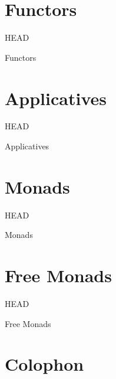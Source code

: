 \documentclass[utf8x,notes,17pt]{beamer}
\newcommand{\head}[1]{\begin{center}
\vspace{13mm}\hspace{-1mm}\Huge{{#1}}
\end{center}}
\begin{document}
\section{Functors}
\label{sec-14}
\begin{frame}[fragile,plain,label=sec-14-1]{HEAD}
\head{Functors}
\end{frame}
\section{Applicatives}
\label{sec-15}
\begin{frame}[fragile,plain,label=sec-15-1]{HEAD}
\head{Applicatives}
\end{frame}
\section{Monads}
\label{sec-16}
\begin{frame}[fragile,plain,label=sec-16-1]{HEAD}
\head{Monads}
\end{frame}
\section{Free Monads}
\label{sec-17}
\begin{frame}[fragile,plain,label=sec-17-1]{HEAD}
\head{Free Monads}
\end{frame}
\section{Colophon}
\label{sec-18}
\end{document}
